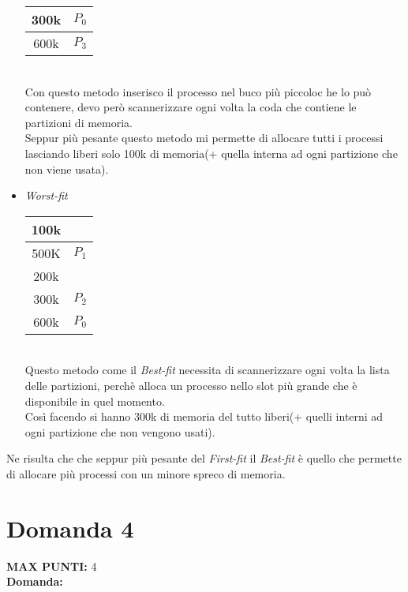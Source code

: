 \documentclass{article}
\begin{document}
\begin{itemize}
\begin{minipage}[c]{0.3\textwidth}
\begin{tabular}{|c|c|}
                    \hline
                    300k & $P_0$\\
                    \hline
                    600k & $P_3$\\
                    \hline
                \end{tabular}
            \end{minipage}\\
            Con questo metodo inserisco il processo nel buco più piccoloc he lo può contenere, devo però scannerizzare ogni volta la coda che contiene le partizioni di memoria.\\
            Seppur più pesante questo metodo mi permette di allocare tutti i processi lasciando liberi solo 100k di memoria(+ quella interna ad ogni partizione che non viene usata).
        \item \emph{Worst-fit}
            \begin{minipage}[c]{0.3\textwidth}
                \begin{tabular}{|c|c|}
                    \hline
                    100k & \\
                    \hline
                    500K & $P_1$\\
                    \hline
                    200k & \\
                    \hline
                    300k & $P_2$\\
                    \hline
                    600k & $P_0$\\
                    \hline
                \end{tabular}
            \end{minipage}\\
            Questo metodo come il \emph{Best-fit} necessita di scannerizzare ogni volta la lista delle partizioni, perchè alloca un processo nello slot più grande che è disponibile in quel momento.\\
            Così facendo si hanno 300k di memoria del tutto liberi(+ quelli interni ad ogni partizione che non vengono usati).
    \end{itemize}
    Ne risulta che che seppur più pesante del \emph{First-fit} il \emph{Best-fit} è quello che permette di allocare più processi con un minore spreco di memoria.
    \section*{Domanda 4}
    \textbf{MAX PUNTI:} 4\\
    \textbf{Domanda:}
\end{document}

